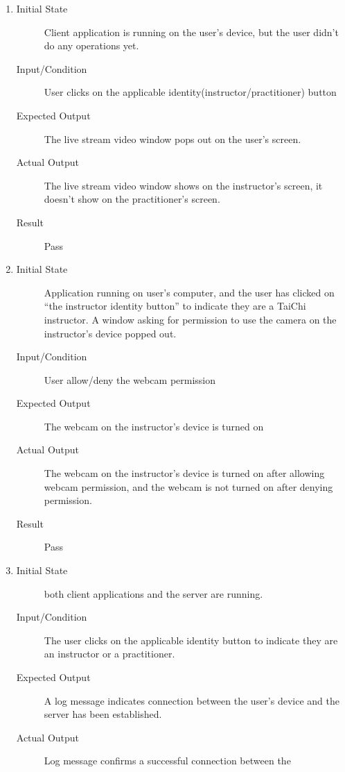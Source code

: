 \documentclass[12pt, titlepage]{article}
\begin{document}
\begin{enumerate}[FR-T1]
  \item \label{FRT1}
    \begin{description}
    \item[Initial State] Client application is running on the user's device, but
      the user didn’t do any operations yet.
    \item[Input/Condition] User clicks on the applicable
      identity(instructor/practitioner) button
    \item[Expected Output] The live stream video window pops out on the user's
      screen.
    \item[Actual Output] The live stream video window shows on the instructor's
      screen, it doesn't show on the practitioner's screen.
    \item[Result] Pass
    \end{description}
  \item \label{FRT2}
    \begin{description}
    \item[Initial State] Application running on user’s computer, and the user has
      clicked on “the instructor identity button” to indicate they are a TaiChi
      instructor. A window asking for permission to use the camera on the
      instructor's device popped out.
    \item[Input/Condition] User allow/deny the webcam permission
    \item[Expected Output] The webcam on the instructor’s device is turned on
    \item[Actual Output] The webcam on the instructor’s device is turned on after
      allowing webcam permission, and the webcam is not turned on after denying
      permission.
    \item[Result] Pass
    \end{description}
  \item \label{FRT3}
    \begin{description}
    \item[Initial State] both client applications and the server are running.
    \item[Input/Condition] The user clicks on the applicable identity button to
      indicate they are an instructor or a practitioner.
    \item[Expected Output] A log message indicates connection between the user’s
      device and the server has been established.
    \item[Actual Output] Log message confirms a successful connection between the

\end{description}
\end{enumerate}
\end{document}
